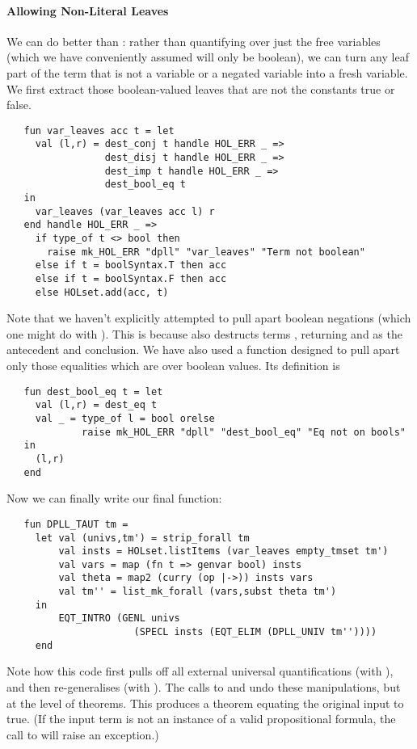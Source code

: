 \paragraph{Allowing Non-Literal Leaves}
We can do better than : rather than quantifying over
just the free variables (which we have conveniently assumed will only
be boolean), we can turn any leaf part of the term that is not a
variable or a negated variable into a fresh variable.  We first
extract those boolean-valued leaves that are not the constants true or
false.
\begin{hol}
\begin{verbatim}
   fun var_leaves acc t = let
     val (l,r) = dest_conj t handle HOL_ERR _ =>
                 dest_disj t handle HOL_ERR _ =>
                 dest_imp t handle HOL_ERR _ =>
                 dest_bool_eq t
   in
     var_leaves (var_leaves acc l) r
   end handle HOL_ERR _ =>
     if type_of t <> bool then
       raise mk_HOL_ERR "dpll" "var_leaves" "Term not boolean"
     else if t = boolSyntax.T then acc
     else if t = boolSyntax.F then acc
     else HOLset.add(acc, t)
\end{verbatim}
\end{hol}
Note that we haven't explicitly attempted to pull apart boolean
negations (which one might do with ).  This is because
 also destructs terms , returning
 and  as the antecedent and conclusion.  We have
also used a function  designed to pull apart only
those equalities which are over boolean values.  Its definition is
\begin{hol}
\begin{verbatim}
   fun dest_bool_eq t = let
     val (l,r) = dest_eq t
     val _ = type_of l = bool orelse
             raise mk_HOL_ERR "dpll" "dest_bool_eq" "Eq not on bools"
   in
     (l,r)
   end
\end{verbatim}
\end{hol}

Now we can finally write our final  function:
\begin{hol}
\begin{verbatim}
   fun DPLL_TAUT tm =
     let val (univs,tm') = strip_forall tm
         val insts = HOLset.listItems (var_leaves empty_tmset tm')
         val vars = map (fn t => genvar bool) insts
         val theta = map2 (curry (op |->)) insts vars
         val tm'' = list_mk_forall (vars,subst theta tm')
     in
         EQT_INTRO (GENL univs
                      (SPECL insts (EQT_ELIM (DPLL_UNIV tm''))))
     end
\end{verbatim}
\end{hol}
Note how this code first pulls off all external universal
quantifications (with ), and then re-generalises
(with ).  The calls to  and 
undo these manipulations, but at the level of theorems.  This produces
a theorem equating the original input to true.  (If the input term is
not an instance of a valid propositional formula, the call to
 will raise an exception.)

